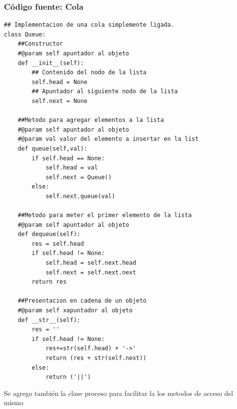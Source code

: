 \documentclass[12pt]{article}
\begin{document}
\subsubsection{Código fuente: Cola}
\begin{verbatim}
## Implementacion de una cola simplemente ligada.
class Queue:
    ##Constructor
    #@param self apuntador al objeto
    def __init__(self):
        ## Contenido del nodo de la lista
        self.head = None
        ## Apuntador al siguiente nodo de la lista
        self.next = None

    ##Metodo para agregar elementos a la lista
    #@param self apuntador al objeto
    #@param val valor del elemento a insertar en la list
    def queue(self,val):
        if self.head == None:
            self.head = val
            self.next = Queue()
        else:
            self.next.queue(val)

    ##Metodo para meter el primer elemento de la lista
    #@param self apuntador al objeto
    def dequeue(self):
        res = self.head
        if self.head != None:
            self.head = self.next.head
            self.next = self.next.next
        return res

    ##Presentacion en cadena de un objeto
    #@param self xapuntador al objeto
    def __str__(self):
        res = ''
        if self.head != None:
            res+=str(self.head) + '->'
            return (res + str(self.next))
        else:
            return ('||')

\end{verbatim}
Se agrego también la clase proceso para facilitar la los metodos de acceso del mismo
\end{document}
